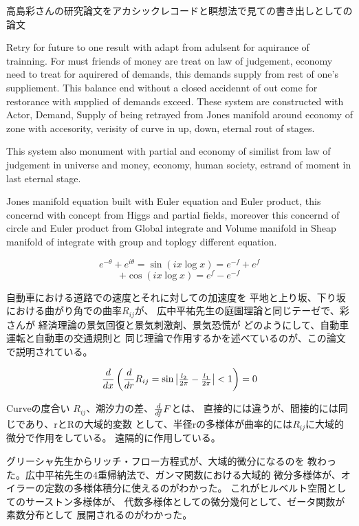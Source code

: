 \documentclass{jsarticle}
\begin{document}
高島彩さんの研究論文をアカシックレコードと瞑想法で見ての書き出しとしての
論文


   Retry for future to one result with adapt from adulsent for
aquirance of trainning. For must friends of money are treat on
law of judgement, economy need to treat for aquirered of demands,
this demands supply from rest of  one's suppliement.
This balance end without a closed accidennt of out come for
restorance with supplied of demands exceed.
These system are constructed with Actor, Demand, Supply of
being retrayed from Jones manifold around economy of zone
with accesority, verisity of curve in up, down, eternal
rout of stages.

    This system also monument with partial and economy of
similist from law of judgement in universe and money, economy,
human society, estrand of moment in last eternal stage.
  

   Jones manifold equation built with Euler equation and Euler product,
this concernd with concept from Higgs and partial fields,
moreover this concernd of circle and Euler product from
Global integrate and Volume manifold in Sheap manifold of integrate
with group and toplogy different equation.

$$ e^{- \theta} + e^{i \theta} = \sin (i x \log x) = e^{-f} + e^{f} $$
$$ + \cos (i x \log x) = e^{f} - e^{-f} $$

  自動車における道路での速度とそれに対しての加速度を
  平地と上り坂、下り坂における曲がり角での曲率$R_{ij}$が、
  広中平祐先生の庭園理論と同じテーゼで、彩さんが
  経済理論の景気回復と景気刺激剤、景気恐慌が
  どのようにして、自動車運転と自動車の交通規則と
  同じ理論で作用するかを述べているのが、この論文で説明されている。 


  $$ {d \over dx}\left({d \over d r}R_{ij} = \sin
	  \begin{vmatrix} {l_2 \over {2 \pi}} 
- {l_1 \over {2 \pi}}\end{vmatrix}  < 1 \right) = 0 $$


      Curveの度合い $R_{ij}$、潮汐力の差、${d \over d f}F$とは、
   直接的には違うが、間接的には同じであり、rとRの大域的変数
   として、半径rの多様体が曲率的には$R_{ij}$に大域的微分で作用をしている。
   遠隔的に作用している。


      グリーシャ先生からリッチ・フロー方程式が、大域的微分になるのを
   教わった。広中平祐先生の4重帰納法で、ガンマ関数における大域的
   微分多様体が、オイラーの定数の多様体積分に使えるのがわかった。
   これがヒルベルト空間としてのサーストン多様体が、
   代数多様体としての微分幾何として、ゼータ関数が素数分布として
   展開されるのがわかった。
\end{document}
